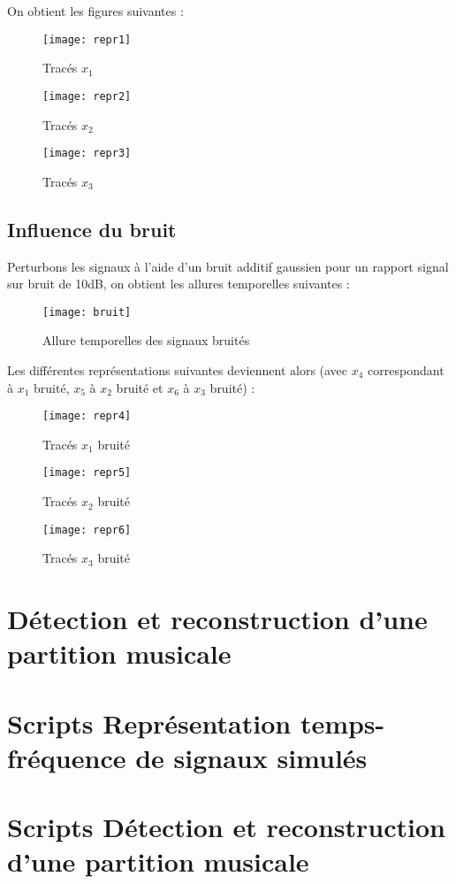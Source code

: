 \documentclass[12pt,a4paper,titlepage]{article}
\begin{document}
On obtient les figures suivantes :

\begin{figure}[H]
    \caption{Tracés $x_1$}
    \texttt{[image: repr1]}
    \centering
\end{figure}

\begin{figure}[H]
    \caption{Tracés $x_2$}
    \texttt{[image: repr2]}
    \centering
\end{figure}

\begin{figure}[H]
    \caption{Tracés $x_3$}
    \texttt{[image: repr3]}
    \centering
\end{figure}

\subsection{Influence du bruit}

Perturbons les signaux à l'aide d'un bruit additif gaussien pour un rapport signal sur bruit de
10dB, on obtient les allures temporelles suivantes :

\begin{figure}[H]
    \caption{Allure temporelles des signaux bruités}
    \texttt{[image: bruit]}
    \centering
\end{figure}

Les différentes représentations suivantes deviennent alors (avec $x_4$ correspondant à $x_1$ bruité,
$x_5$ à $x_2$ bruité et $x_6$ à $x_3$ bruité) :

\begin{figure}[H]
    \caption{Tracés $x_1$ bruité}
    \texttt{[image: repr4]}
    \centering
\end{figure}

\begin{figure}[H]
    \caption{Tracés $x_2$ bruité}
    \texttt{[image: repr5]}
    \centering
\end{figure}

\begin{figure}[H]
    \caption{Tracés $x_3$ bruité}
    \texttt{[image: repr6]}
    \centering
\end{figure}

\pagebreak

\section{Détection et reconstruction d'une partition musicale}

\begin{appendices}

    \section{Scripts Représentation temps-fréquence de signaux simulés}

    

    \section{Scripts Détection et reconstruction d'une partition musicale}

    

\end{appendices}
\end{document}
